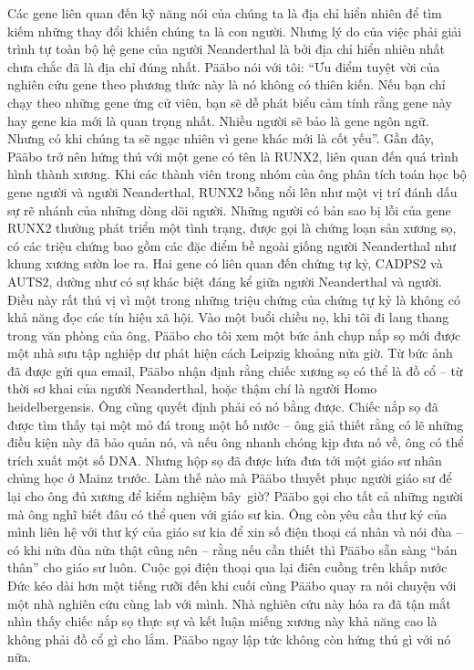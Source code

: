\begin{multicols}{2}
	\vskip 0.1cm
	Các gene liên quan đến kỹ năng nói của chúng ta là địa chỉ hiển nhiên để tìm kiếm những thay đổi khiến chúng ta là con người. Nhưng lý do của việc phải giải trình tự toàn bộ hệ gene của người Neanderthal là bởi địa chỉ hiển nhiên nhất chưa chắc đã là địa chỉ đúng nhất.
	\vskip 0.1cm
	Pääbo nói với tôi: “Ưu điểm tuyệt vời của nghiên cứu gene theo phương thức này là nó không có thiên kiến. Nếu bạn chỉ chạy theo những gene ứng cử viên, bạn sẽ dễ phát biểu cảm tính rằng gene này hay gene kia mới là quan trọng nhất. Nhiều người sẽ bảo là gene ngôn ngữ. Nhưng có khi chúng ta sẽ ngạc nhiên vì gene khác mới là cốt yếu”. Gần đây, Pääbo trở nên hứng thú với một gene có tên là RUNX$2$, liên quan đến quá trình hình thành xương. Khi các thành viên trong nhóm của ông phân tích toán học bộ gene người và người Neanderthal, RUNX$2$ bỗng nổi lên như một vị trí đánh dấu sự rẽ nhánh của những dòng dõi người.
	\vskip 0.1cm
	Những người có bản sao bị lỗi của gene RUNX$2$ thường phát triển một tình trạng, được gọi là chứng loạn sản xương sọ, có các triệu chứng bao gồm các đặc điểm bề ngoài giống người Neanderthal như khung xương sườn loe ra. Hai gene có liên quan đến chứng tự kỷ, CADPS$2$ và AUTS$2$, dường như có sự khác biệt đáng kể giữa người Neanderthal và người. Điều này rất thú vị vì một trong những triệu chứng của chứng tự kỷ là không có khả năng đọc các tín hiệu xã hội.
	\vskip 0.1cm
	Vào một buổi chiều nọ, khi tôi đi lang thang trong văn phòng của ông, Pääbo cho tôi xem một bức ảnh chụp nắp sọ mới được một nhà sưu tập nghiệp dư phát hiện cách Leipzig khoảng nửa giờ. Từ bức ảnh đã được gửi qua email, Pääbo nhận định rằng chiếc xương sọ có thể là đồ cổ -- từ thời sơ khai của người Neanderthal, hoặc thậm chí là người Homo heidelbergensis. Ông cũng quyết định phải có nó bằng được. Chiếc nắp sọ đã được tìm thấy tại một mỏ đá trong một hố nước -- ông giả thiết rằng có lẽ những điều kiện này đã bảo quản nó, và nếu ông nhanh chóng kịp đưa nó về, ông có thể trích xuất một số DNA. Nhưng hộp sọ đã được hứa đưa tới một giáo sư nhân chủng học ở Mainz trước. Làm thế nào mà Pääbo thuyết phục người giáo sư để lại cho ông đủ xương để kiểm nghiệm bây~giờ?
	\vskip 0.1cm
	Pääbo gọi cho tất cả những người mà ông nghĩ biết đâu có thể quen với giáo sư kia. Ông còn yêu cầu thư ký của mình liên hệ với thư ký của giáo sư kia để xin số điện thoại cá nhân và nói đùa -- có khi nửa đùa nửa thật cũng nên -- rằng nếu cần thiết thì Pääbo sẵn sàng “bán thân” cho giáo sư luôn. Cuộc gọi điện thoại qua lại điên cuồng trên khắp nước Đức kéo dài hơn một tiếng rưỡi đến khi cuối cùng Pääbo quay ra nói chuyện với một nhà nghiên cứu cùng lab với mình. Nhà nghiên cứu này hóa ra đã tận mắt nhìn thấy chiếc nắp sọ thực sự và kết luận miếng xương này khả năng cao là không phải đồ cổ gì cho lắm. Pääbo ngay lập tức không còn hứng thú gì với nó nữa.

\end{multicols}
